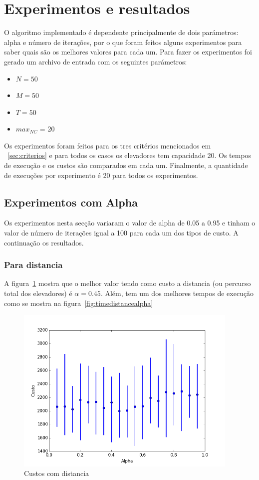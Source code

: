 \section{Experimentos e resultados} 

O algoritmo implementado é dependente principalmente de dois parámetros: alpha e número de iterações, por o que foram feitos alguns experimentos para saber quais são os melhores valores para cada um.
Para fazer os experimentos foi gerado um archivo de entrada com os seguintes parámetros:
	\begin{itemize}
		\item $N = 50$
		\item $M = 50$
		\item $T = 50$
		\item ${max}_{NC}$ = 20
	\end{itemize}
	Os experimentos foram feitos para os tres critérios mencionados em ~\ref{sec:criterios} e para todos os casos os elevadores tem capacidade 20. Os tempos de execução e os custos são comparados em cada um. Finalmente, a quantidade de execuções por experimento é 20 para todos os experimentos.

\subsection{Experimentos com Alpha}
\label{subsec:expalpha}
	Os experimentos nesta secção variaram o valor de alpha de 0.05 a 0.95 e tinham o valor de número de iterações igual a 100 para cada um dos tipos de custo. A continuação os resultados.
	\subsubsection{Para distancia}
		A figura~\ref{fig:costdistancealpha} mostra que o melhor valor tendo como custo a distancia (ou percurso total dos elevadores) é $\alpha = 0.45$. Além, tem um dos melhores tempos de execução como se mostra na figura~\ref{fig:timedistancealpha}
		\begin{figure}[H]
			\centering
			\includegraphics[height=8cm]{images/cost_distance_alpha}
			\caption{Custos com distancia}
			\label{fig:costdistancealpha}
		\end{figure}
		
